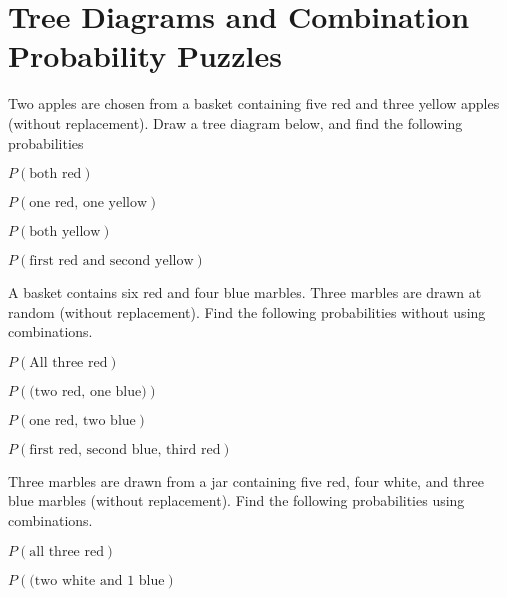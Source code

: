 \section{Tree Diagrams and Combination Probability Puzzles}


Two apples are chosen from a basket containing five red and three yellow apples (without replacement). Draw a tree diagram below,
and find the following probabilities

\begin{puzzle}
    \( P(\text{both red}) \)
\end{puzzle}

\begin{puzzle}
    \( P(\text{one red, one yellow}) \)
\end{puzzle}

\begin{puzzle}
    \( P(\text{both yellow}) \)
\end{puzzle}

\begin{puzzle}
    \( P(\text{first red and second yellow}) \)
\end{puzzle}

A basket contains six red and four blue marbles. Three marbles are drawn at random (without replacement). Find the following
probabilities without using combinations.

\begin{puzzle}
    \( P(\text{All three red})\)
\end{puzzle}

\begin{puzzle}
    \( P(\text{(two red, one blue)})\)
\end{puzzle}

\begin{puzzle}
    \( P(\text{one red, two blue})\)
\end{puzzle}

\begin{puzzle}
    \( P(\text{first red, second blue, third red})\)
\end{puzzle}

Three marbles are drawn from a jar containing five red, four white, and three blue marbles (without replacement). Find the
following probabilities using combinations.


\begin{puzzle}
    \( P(\text{all three red})\)
\end{puzzle}

\begin{puzzle}
    \( P(\text{(two white and 1 blue})\)
\end{puzzle}

